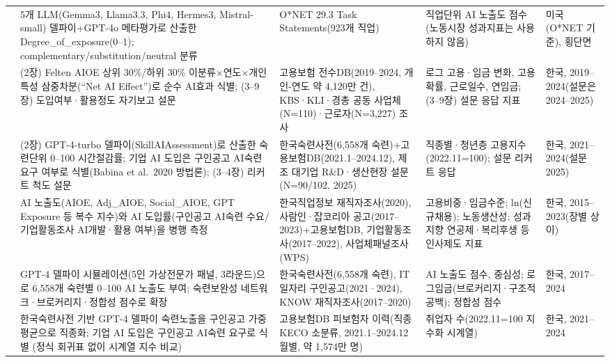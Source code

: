 \documentclass[11pt]{article}
\begin{document}
\begin{longtable}{L{2.3cm}L{4.1cm}L{3.6cm}L{2.6cm}L{2.3cm}}
\citet{son-2025-llm-based-ai-job-exposure-measurement} &
5개 LLM(Gemma3, Llama3.3, Phi4, Hermes3, Mistral-small) 델파이+GPT-4o 메타평가로 산출한 Degree\_of\_exposure(0--1); complementary/substitution/neutral 분류 &
O*NET 29.3 Task Statements(923개 직업) &
직업단위 AI 노출도 점수(노동시장 성과지표는 사용하지 않음) &
미국(O*NET 기준), 횡단면\\

\citet{noh-2025-ai-labor-coexistence} &
(2장) Felten AIOE 상위 30\%/하위 30\% 이분류$\times$연도$\times$개인특성 삼중차분(``Net AI Effect'')로 순수 AI효과 식별; (3--9장) 도입여부·활용정도 자기보고 설문 &
고용보험 전수DB(2019--2024, 개인-연도 약 4,120만 건), KBS·KLI·경총 공동 사업체(N=110)·근로자(N=3,227) 조사 &
로그 고용·임금 변화, 고용확률, 근로일수, 연임금; (3--9장) 설문 응답 지표 &
한국, 2019--2024(설문은 2024--2025)\\

\citet{noh-2025-ai-based-manufacturing-innovation-employment} &
(2장) GPT-4-turbo 델파이(SkillAIAssessment)로 산출한 숙련단위 0--100 시간절감률; 기업 AI 도입은 구인공고 AI숙련 요구 여부로 식별(Babina et al.\ 2020 방법론); (3--4장) 리커트 척도 설문 &
한국숙련사전(6,558개 숙련)+고용보험DB(2021.1--2024.12), 제조 대기업 R\&D·생산현장 설문(N=90/102, 2025) &
직종별·청년층 고용지수(2022.11=100); 설문 리커트 응답 &
한국, 2021--2024(설문 2025)\\

\citet{chang-2024-ai-development-employment-effects} &
AI 노출도(AIOE, Adj\_AIOE, Social\_AIOE, GPT Exposure 등 복수 지수)와 AI 도입률(구인공고 AI숙련 수요/기업활동조사 AI개발·활용 여부)을 병행 측정 &
한국직업정보 재직자조사(2020), 사람인·잡코리아 공고(2017--2023)+고용보험DB, 기업활동조사(2017--2022), 사업체패널조사(WPS) &
고용비중·임금수준; ln(신규채용); 노동생산성; 성과지향 연공제·복리후생 등 인사제도 지표 &
한국, 2015--2023(장별 상이)\\

\citet{chang-2025-ai-era-skills} &
GPT-4 델파이 시뮬레이션(5인 가상전문가 패널, 3라운드)으로 6,558개 숙련별 0--100 AI 노출도 부여; 숙련보완성 네트워크·브로커리지·정합성 점수로 확장 &
한국숙련사전(6,558개 숙련), IT일자리 구인공고(2021·2024), KNOW 재직자조사(2017--2020) &
AI 노출도 점수, 중심성; 로그임금(브로커리지·구조적공백); 정합성 점수 &
한국, 2017--2024\\

\citet{chang-2026-ai-technology-diffusion-employment} &
한국숙련사전 기반 GPT-4 델파이 숙련노출을 구인공고 가중평균으로 직종화; 기업 AI 도입은 구인공고 AI숙련 요구로 식별 (정식 회귀표 없이 시계열 지수 비교) &
고용보험DB 피보험자 이력(직종 KECO 소분류, 2021.1--2024.12 월별, 약 1,574만 명) &
취업자 수(2022.11=100 지수화 시계열) &
한국, 2021--2024\\
\end{longtable}
\end{document}
